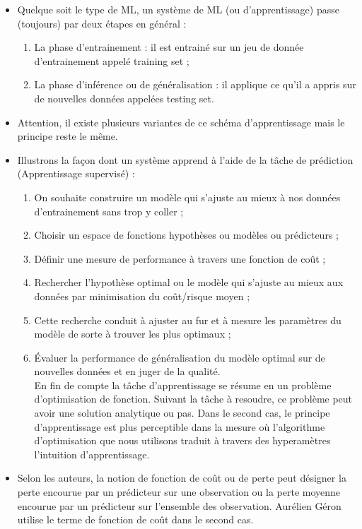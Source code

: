\documentclass[executivepaper]{article}
\begin{document}
\begin{itemize}
\begin{enumerate}
\end{enumerate}
\item Quelque soit le type de ML, un système de ML (ou d'apprentissage) passe (toujours) par deux étapes en général :
\begin{enumerate}
\item La phase d'entrainement : il est entrainé sur un jeu de donnée d'entrainement appelé training set ;
\item La phase d'inférence ou de généralisation :  il applique ce qu'il a appris sur de nouvelles données appelées testing set.
\end{enumerate}
\item Attention, il existe plusieurs variantes de ce schéma d'apprentissage mais le principe reste le même.\\
\item Illustrons la façon dont un système apprend à l'aide de la  tâche de prédiction (Apprentissage supervisé) : 

\begin{enumerate}
\item On souhaite construire un modèle qui s'ajuste au mieux à nos données d'entrainement sans trop y coller ;
\item Choisir un espace de fonctions hypothèses ou modèles ou prédicteurs ;
\item Définir une mesure de performance à travers une fonction de coût ;
\item Rechercher l'hypothèse optimal ou le modèle qui s'ajuste au mieux aux données par minimisation du coût/risque moyen ;
\item Cette recherche conduit à ajuster au fur et à mesure les paramètres du modèle de sorte à trouver les plus optimaux ; 
\item Évaluer la performance de généralisation du modèle optimal sur de nouvelles données et en juger de la qualité.\\


En fin de compte la tâche d'apprentissage se résume en un problème d'optimisation de fonction. Suivant la tâche à resoudre, ce problème peut avoir une solution analytique ou pas. Dans le second cas, le principe d'apprentissage est plus perceptible dans la mesure où l'algorithme d'optimisation que nous utilisons traduit à travers des hyperamètres l'intuition d'apprentissage.\\

\end{enumerate}

\item Selon les auteurs, la notion de fonction de coût ou de perte peut désigner la perte encourue par un prédicteur sur une observation ou la perte moyenne encourue par un prédicteur sur l'ensemble des observation. Aurélien Géron utilise le terme de fonction de coût dans le second cas.\\



\end{itemize}
\end{document}
